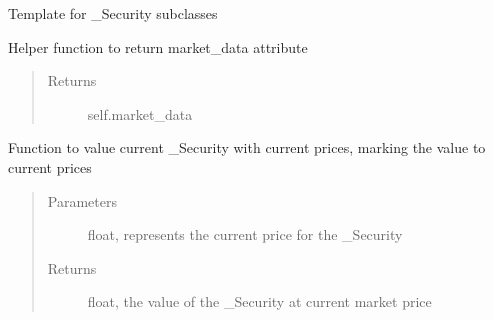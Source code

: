 \documentclass[letterpaper,10pt,english]{sphinxmanual}
\begin{document}
\begin{fulllineitems}
\label{\detokenize{securities:risk_dash.securities._Security}}
\sphinxAtStartPar
Template for \_Security subclasses

\begin{fulllineitems}
\label{\detokenize{securities:risk_dash.securities._Security.get_marketdata}}
\sphinxAtStartPar
Helper function to return market\_data attribute
\begin{quote}\begin{description}
\item[{Returns}] \leavevmode
\sphinxAtStartPar
self.market\_data

\end{description}\end{quote}

\end{fulllineitems}


\begin{fulllineitems}
\label{\detokenize{securities:risk_dash.securities._Security.mark_to_market}}
\sphinxAtStartPar
Function to value current \_Security with current prices, marking the value to current prices
\begin{quote}\begin{description}
\item[{Parameters}] \leavevmode
\sphinxAtStartPar
{} \textendash{} float, represents the current price for the \_Security

\item[{Returns}] \leavevmode
\sphinxAtStartPar
float, the value of the \_Security at current market price


\end{description}
\end{quote}
\end{fulllineitems}
\end{fulllineitems}
\end{document}
